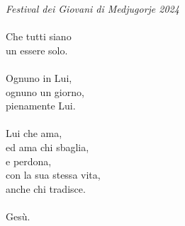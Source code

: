 \begin{haiku}
\emph{Festival dei Giovani di Medjugorje 2024}\\
\leavevmode\\
Che tutti siano\\
un essere solo.\\
\leavevmode\\
Ognuno in Lui,\\
ognuno un giorno,\\
pienamente Lui.\\
\leavevmode\\
Lui che ama,\\
ed ama chi sbaglia,\\
e perdona,\\
con la sua stessa vita,\\
anche chi tradisce.\\
\leavevmode\\
Gesù.\\
\end{haiku}

